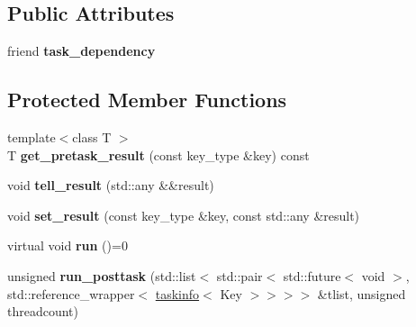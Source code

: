 \subsection*{Public Attributes}
\begin{DoxyCompactItemize}
\item 
\mbox{\label{classouchi_1_1task_1_1taskinfo_ae8df1f559435ef2b32fe46a9356ad884}} 
friend {\bfseries task\+\_\+dependency}
\end{DoxyCompactItemize}
\subsection*{Protected Member Functions}
\begin{DoxyCompactItemize}
\item 
\mbox{\label{classouchi_1_1task_1_1taskinfo_a37b3905030468612d293fba1b8963f8c}} 
{\footnotesize template$<$class T $>$ }\\T {\bfseries get\+\_\+pretask\+\_\+result} (const key\+\_\+type \&key) const
\item 
\mbox{\label{classouchi_1_1task_1_1taskinfo_a98d30dadf393c8365e96f2bf30ff8791}} 
void {\bfseries tell\+\_\+result} (std\+::any \&\&result)
\item 
\mbox{\label{classouchi_1_1task_1_1taskinfo_aa080fcb4e737e78aeeae162c74dff574}} 
void {\bfseries set\+\_\+result} (const key\+\_\+type \&key, const std\+::any \&result)
\item 
\mbox{\label{classouchi_1_1task_1_1taskinfo_a06d8c0489f05999103d0708ea26f1912}} 
virtual void {\bfseries run} ()=0
\item 
\mbox{\label{classouchi_1_1task_1_1taskinfo_ac4e620dd89d24d1cdef0ff7d59049d73}} 
unsigned {\bfseries run\+\_\+posttask} (std\+::list$<$ std\+::pair$<$ std\+::future$<$ void $>$, std\+::reference\+\_\+wrapper$<$ \mbox{\hyperlink{classouchi_1_1task_1_1taskinfo}{taskinfo}}$<$ Key $>$$>$$>$$>$ \&tlist, unsigned threadcount)
\end{DoxyCompactItemize}
